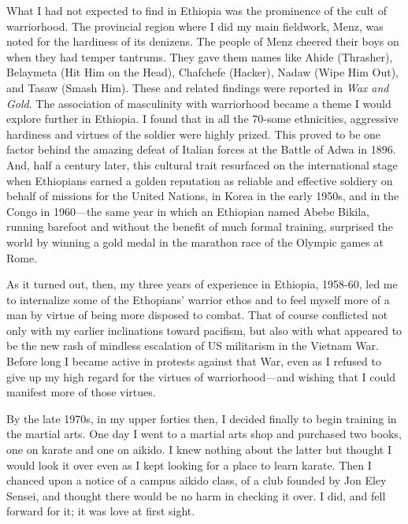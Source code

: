 What I had not expected to find in Ethiopia was the prominence of the cult of warriorhood. The provincial region where I did my main fieldwork, Menz, was noted for the hardiness of its denizens. The people of Menz cheered their boys on when they had temper tantrums. They gave them names like Ahide (Thrasher), Belaymeta (Hit Him on the Head), Chafchefe (Hacker), Nadaw (Wipe Him Out), and Tasaw (Smash Him). These and related findings were reported in \emph{Wax and Gold}. The association of masculinity with warriorhood became a theme I would explore further in Ethiopia. I found that in all the 70-some ethnicities, aggressive hardiness and virtues of the soldier were highly prized. This proved to be one factor behind the amazing defeat of Italian forces at the Battle of Adwa in 1896. And, half a century later, this cultural trait resurfaced on the international stage when Ethiopians earned a golden reputation as reliable and effective soldiery on behalf of missions for the United Nations, in Korea in the early 1950s, and in the Congo in 1960---the same year in which an Ethiopian named Abebe Bikila, running barefoot and without the benefit of much formal training, surprised the world by winning a gold medal in the marathon race of the Olympic games at Rome.

As it turned out, then, my three years of experience in Ethiopia, 1958-60, led me to internalize some of the Ethopians' warrior ethos and to feel myself more of a man by virtue of being more disposed to combat. That of course conflicted not only with my earlier inclinations toward pacifism, but also with what appeared to be the new rash of mindless escalation of US militarism in the Vietnam War. Before long I became active in protests against that War, even as I refused to give up my high regard for the virtues of warriorhood---and wishing that I could manifest more of those virtues. 

By the late 1970s, in my upper forties then, I decided finally to begin training in the martial arts. One day I went to a martial arts shop and purchased two books, one on karate and one on aikido. I knew nothing about the latter but thought I would look it over even as I kept looking for a place to learn karate. Then I chanced upon a notice of a campus aikido class, of a club founded by Jon Eley Sensei, and thought there would be no harm in checking it over. I did, and fell forward for it; it was love at first sight.

\vspace{1.5em}

